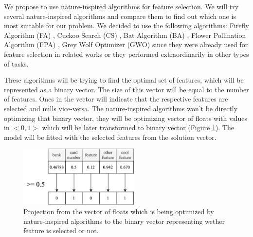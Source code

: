 \documentclass[runningheads]{llncs}
\begin{document}



We propose to use nature-inspired algorithms for feature selection. We will try several nature-inspired algorithms and compare them to find out which one is most suitable for our problem. We decided to use the following algorithms: Firefly Algorithm (FA) \cite{fister2013comprehensive}, Cuckoo Search (CS) \cite{yang2009cuckoo}, Bat Algorithm (BA) \cite{yang2010new}, Flower Pollination Algorithm (FPA) \cite{yang2012flower}, Grey Wolf Optimizer (GWO) \cite{Mirjalili_Mirjalili_Lewis_2014} since they were already used for feature selection in related works or they performed extraordinarily in other types of tasks.

These algorithms will be trying to find the optimal set of features, which will be represented as a binary vector. The size of this vector will be equal to the number of features. Ones in the vector will indicate that the respective features are selected and nulls vice-versa. The nature-inspired algorithms won't be directly optimizing that binary vector, they will be optimizing vector of floats with values in $<0, 1>$ which will be later transformed to binary vector (Figure \ref{fig:projection}). The model will be fitted with the selected features from the solution vector.

\begin{figure}[ht]
	\begin{center}
	    \includegraphics[width=6cm]{figures/projection.png}
    \end{center}
	\caption{Projection from the vector of floats which is being optimized by nature-inspired algorithms to the binary vector representing wether feature is selected or not.}
	\label{fig:projection}
\end{figure}
\end{document}
